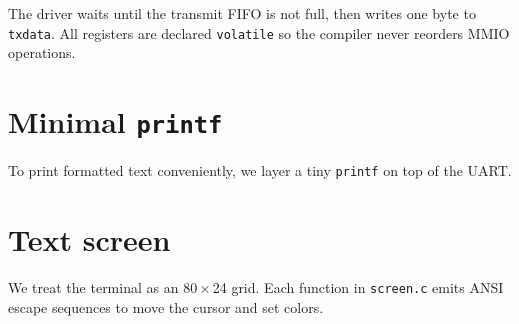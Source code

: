 \begin{figure}[htb]
\centering

\end{figure}

\begin{figure}[htb]
\centering

\end{figure}

\noindent
The driver waits until the transmit FIFO is not full, then writes one byte to \texttt{txdata}.  
All registers are declared \texttt{volatile} so the compiler never reorders MMIO operations.

\section*{Minimal \texttt{printf}}

To print formatted text conveniently, we layer a tiny \texttt{printf} on top of the UART.

\begin{figure}[htb]
\centering

\end{figure}

\begin{figure}[htb]
\centering

\end{figure}

\section*{Text screen}

We treat the terminal as an 80\,$\times$\,24 grid.  
Each function in \texttt{screen.c} emits ANSI escape sequences to move the cursor and set colors.

\begin{figure}[htb]
\centering

\end{figure}

\begin{figure}[htb]
\centering

\end{figure}


